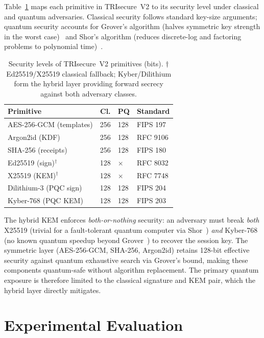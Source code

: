 \documentclass[conference]{IEEEtran}
\begin{document}
Table~\ref{tab:security_levels} maps each primitive in TRIsecure~V2 to
its security level under classical and quantum adversaries.
Classical security follows standard key-size arguments; quantum security
accounts for Grover's algorithm (halves symmetric key strength in the
worst case)~\cite{grover1996fast} and Shor's algorithm (reduces
discrete-log and factoring problems to polynomial time)~\cite{shor1994algorithms}.

\begin{table}[t]
\centering
\caption{Security levels of TRIsecure~V2 primitives (bits).
  $\dagger$ Ed25519/X25519 classical fallback; Kyber/Dilithium form the
  hybrid layer providing forward secrecy against both adversary classes.}
\label{tab:security_levels}
\begin{tabular}{lcll}
  \toprule
  Primitive & Cl. & PQ & Standard \\
  \midrule
  AES-256-GCM (templates) & 256 & 128 & FIPS 197 \\
  Argon2id (KDF)          & 256 & 128 & RFC 9106 \\
  SHA-256 (receipts)      & 256 & 128 & FIPS 180 \\
  Ed25519 (sign)$^\dagger$ & 128 & $\times$ & RFC 8032 \\
  X25519 (KEM)$^\dagger$  & 128 & $\times$ & RFC 7748 \\
  Dilithium-3 (PQC sign)  & 128 & 128 & FIPS 204 \\
  Kyber-768 (PQC KEM)     & 128 & 128 & FIPS 203 \\
  \bottomrule
\end{tabular}
\end{table}

The hybrid KEM enforces \emph{both-or-nothing} security: an adversary
must break \emph{both} X25519 (trivial for a fault-tolerant quantum
computer via Shor~\cite{shor1994algorithms}) \emph{and} Kyber-768
(no known quantum speedup beyond Grover~\cite{grover1996fast}) to
recover the session key. The symmetric layer (AES-256-GCM, SHA-256,
Argon2id) retains 128-bit effective security against quantum exhaustive
search via Grover's bound, making these components quantum-safe without
algorithm replacement. The primary quantum exposure is therefore limited
to the classical signature and KEM pair, which the hybrid layer
directly mitigates.

\section{Experimental Evaluation}
\label{sec:evaluation}
\end{document}
